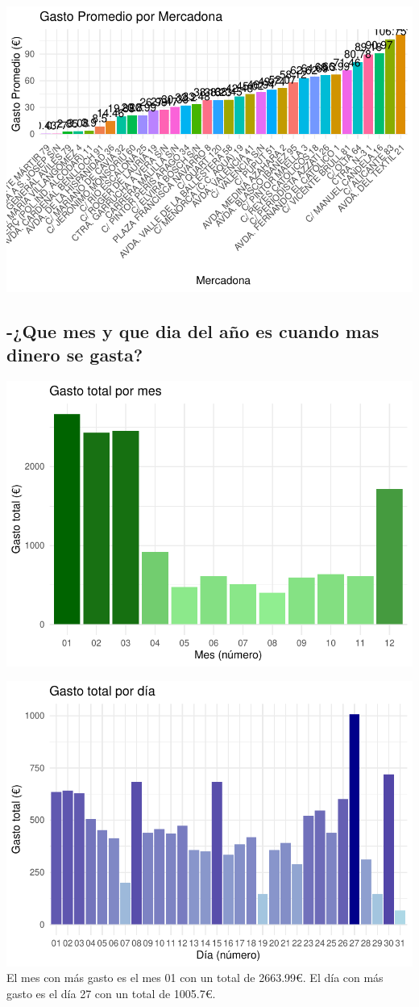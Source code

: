 \documentclass[,article,submit,moreauthors,pdftex]{Definitions/mdpi}
\begin{document}
\includegraphics[width=0.9\linewidth]{ProyectoTD2025_files/figure-latex/unnamed-chunk-30-1}

\hypertarget{que-mes-y-que-dia-del-auxf1o-es-cuando-mas-dinero-se-gasta}{%
\subsection{-¿Que mes y que dia del año es cuando mas dinero se
gasta?}\label{que-mes-y-que-dia-del-auxf1o-es-cuando-mas-dinero-se-gasta}}

\includegraphics[width=0.9\linewidth]{ProyectoTD2025_files/figure-latex/unnamed-chunk-31-1}

\includegraphics[width=0.9\linewidth]{ProyectoTD2025_files/figure-latex/unnamed-chunk-32-1}
El mes con más gasto es el mes 01 con un total de 2663.99€. El día con
más gasto es el día 27 con un total de 1005.7€.
\end{document}
